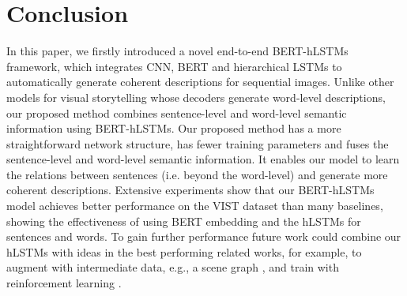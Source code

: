 \documentclass[a4paper,fleqn]{cas-sc}
\begin{document}
\section{Conclusion}

In this paper, we firstly introduced a novel end-to-end BERT-hLSTMs framework, which integrates CNN, BERT and  hierarchical LSTMs to automatically generate coherent descriptions for sequential images. 
Unlike other models for visual storytelling whose decoders generate word-level descriptions, our proposed method combines sentence-level and word-level semantic information using BERT-hLSTMs. 
Our proposed method has a more straightforward network structure, has fewer training parameters and fuses the sentence-level and word-level semantic information. 
It enables our model to learn the relations between sentences (i.e. beyond the word-level) and generate more coherent descriptions.
Extensive experiments show that our BERT-hLSTMs model achieves better performance on the VIST dataset than many baselines, showing the effectiveness of using BERT embedding and the hLSTMs for sentences and words. 
To gain further performance future work could combine our hLSTMs with ideas in the best performing related works, for example, to augment with intermediate data, e.g., a scene graph \citep{wangaaai2020}, and train with reinforcement learning \citep{Huang2019}.



\end{document}
